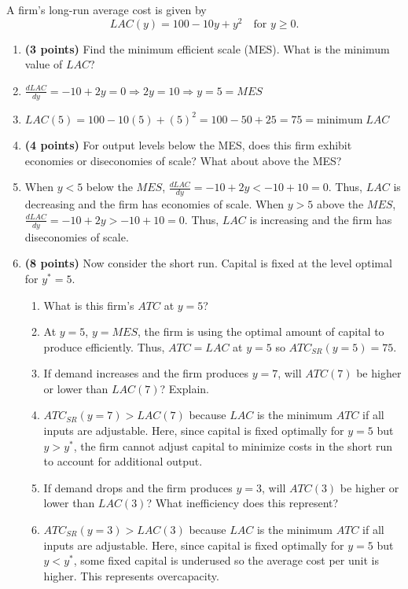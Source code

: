 \documentclass[11pt]{article}
\begin{document}
A firm’s long-run average cost is given by
\[
LAC(y) = 100 - 10y + y^2 \quad \text{for } y \ge 0.
\]

\begin{enumerate}[label=(\alph*)]
    \item \textbf{(3 points)} Find the minimum efficient scale (MES). What is the minimum value of $LAC$?
    \item[] $\frac{dLAC}{dy}=-10+2y=0\Rightarrow2y=10\Rightarrow y=5=MES$
    \item[] $LAC(5)=100-10(5)+(5)^2=100-50+25=75=\text{minimum} \; LAC$

    \item \textbf{(4 points)} For output levels below the MES, does this firm exhibit economies or diseconomies of scale? What about above the MES?
    \item[] When $y<5$ below the $MES$, $\frac{dLAC}{dy}=-10+2y<-10+10=0$. Thus, $LAC$ is decreasing and the firm has economies of scale. When $y>5$ above the $MES$, $\frac{dLAC}{dy}=-10+2y>-10+10=0$. Thus, $LAC$ is increasing and the firm has diseconomies of scale.

    \item \textbf{(8 points)} Now consider the short run. Capital is fixed at the level optimal for $y^* = 5$.
    \begin{enumerate}[label=(\roman*)]
        \item What is this firm’s $ATC$ at $y = 5$?
        \item[] At $y=5$, $y=MES$, the firm is using the optimal amount of capital to produce efficiently. Thus, $ATC=LAC$ at $y=5$ so $ATC_{SR}(y=5)=75$.
        \item If demand increases and the firm produces $y = 7$, will $ATC(7)$ be higher or lower than $LAC(7)$? Explain.
        \item[] $ATC_{SR}(y=7)> LAC(7)$ because $LAC$ is the minimum $ATC$ if all inputs are adjustable. Here, since capital is fixed optimally for $y=5$ but $y>y^*$, the firm cannot adjust capital to minimize costs in the short run to account for additional output.
        \item If demand drops and the firm produces $y = 3$, will $ATC(3)$ be higher or lower than $LAC(3)$? What inefficiency does this represent?
        \item[] $ATC_{SR}(y=3)>LAC(3)$ because $LAC$ is the minimum $ATC$ if all inputs are adjustable. Here, since capital is fixed optimally for $y=5$ but $y<y^*$, some fixed capital is underused so the average cost per unit is higher. This represents overcapacity.
    \end{enumerate}
\end{enumerate}
\end{document}
